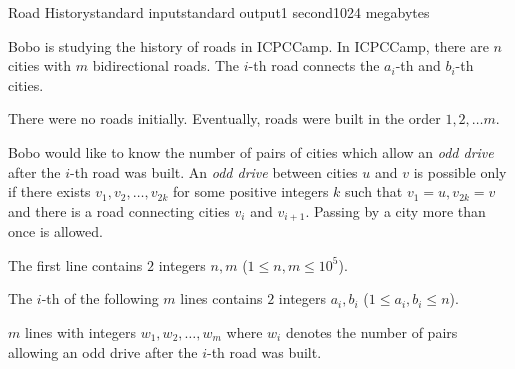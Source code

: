 \begin{problem}{Road History}{standard input}{standard output}{1 second}{1024 megabytes}

Bobo is studying the history of roads in ICPCCamp.
In ICPCCamp, there are $n$ cities with $m$ bidirectional roads.
The $i$-th road connects the $a_i$-th and $b_i$-th cities.

There were no roads initially.
Eventually, roads were built in the order $1, 2, \dots m$. 
 
Bobo would like to know the number of pairs of cities which allow an \textit{odd drive} after the $i$-th road was built.
An \textit{odd drive} between cities $u$ and $v$ is possible only if there exists $v_1, v_2, \dots, v_{2k}$ for some positive integers $k$ such that $v_1 = u, v_{2k} = v$ and there is a road connecting cities $v_i$ and $v_{i + 1}$. Passing by a city more than once is allowed. 

\InputFile
The first line contains $2$ integers $n, m$ ($1 \leq n, m \leq 10^5$). 

The $i$-th of the following $m$ lines contains $2$ integers $a_i, b_i$ ($1 \leq a_i, b_i \leq n$). 

\OutputFile
$m$ lines with integers $w_1, w_2, \dots, w_m$ where $w_i$ denotes the number of pairs allowing an odd drive after the $i$-th road was built.

\Examples

\begin{example}
%
%
\end{example}

\end{problem}

